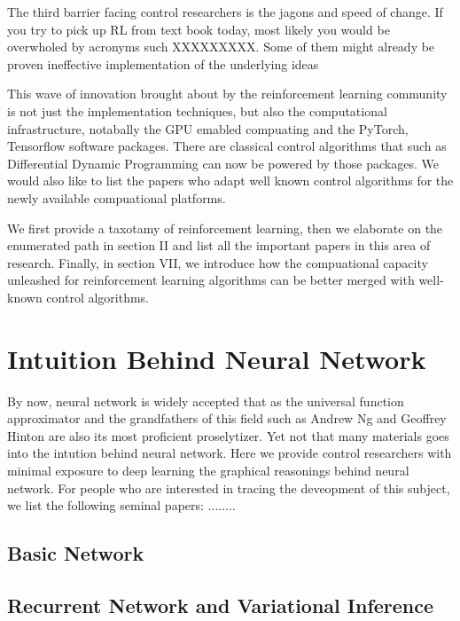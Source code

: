 \documentclass[journal]{IEEEtran}
\begin{document}
The third barrier facing control researchers is the jagons and speed of change. If you try to pick up RL from text book today, most likely you would be overwholed by acronyms such XXXXXXXXX. Some of them might already be proven ineffective implementation of the underlying ideas

This wave of innovation brought about by the reinforcement learning community is not just the implementation techniques, but also the computational infrastructure, notabally the GPU emabled compuating and the PyTorch, Tensorflow software packages. There are classical control algorithms that such as Differential Dynamic Programming can now be powered by those packages. We would also like to list the papers who adapt well known control algorithms for the newly available compuational platforms.

We first provide a taxotamy of reinforcement learning, then we elaborate on the enumerated path in section II and list all the important papers in this area of research. Finally, in section VII, we introduce how the compuational capacity unleashed for reinforcement learning algorithms can be better merged with well-known control algorithms.


\section{Intuition Behind Neural Network}
By now, neural network is widely accepted that as the universal function approximator \cite{Hornik1991ApproximationCO} and the grandfathers of this field such as Andrew Ng and Geoffrey Hinton are also its most proficient proselytizer. Yet not that many materials goes into the intution behind neural network. Here we provide control researchers with minimal exposure to deep learning the graphical reasonings behind neural network. For people who are interested in tracing the deveopment of this subject, we list the following seminal papers: \cite{Schwartz1989TheNC} \cite{Hornik1989MultilayerFN}........

\subsection{Basic Network}

\subsection{Recurrent Network and Variational Inference}
\end{document}
